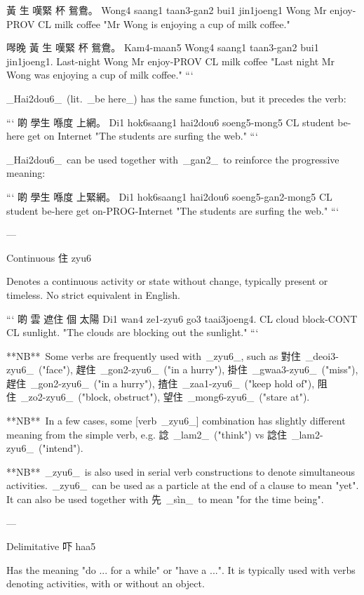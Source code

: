 黃     生      嘆緊         杯    鴛鴦。  
Wong4  saang1  taan3-gan2   bui1  jin1joeng1
Wong   Mr      enjoy-PROV   CL    milk coffee
"Mr Wong is enjoying a cup of milk coffee."  

噖晚        黃      生      嘆緊        杯    鴛鴦。  
Kam4-maan5  Wong4  saang1  taan3-gan2  bui1  jin1joeng1.
Last-night  Wong   Mr      enjoy-PROV  CL    milk coffee
"Last night Mr Wong was enjoying a cup of milk coffee."  
```

_Hai2dou6_ (lit. _be here_) has the same function, but it precedes the verb:

```
啲  學生        喺度       上網。  
Di1 hok6saang1  hai2dou6  soeng5-mong5 
CL  student     be-here   get on Internet
"The students are surfing the web."  
```

_Hai2dou6_ can be used together with _gan2_ to reinforce the progressive meaning:

```
啲  學生        喺度       上緊網。  
Di1 hok6saang1  hai2dou6  soeng5-gan2-mong5  
CL  student     be-here   get on-PROG-Internet
"The students are surfing the web."  
```

---

Continuous 住 zyu6

Denotes a continuous activity or state without change, typically present or timeless. No strict equivalent in English.

```
啲   雲     遮住         個   太陽 
Di1  wan4   ze1-zyu6     go3  taai3joeng4.
CL   cloud  block-CONT   CL  sunlight.  
"The clouds are blocking out the sunlight."  
```

**NB** Some verbs are frequently used with _zyu6_, such as 對住 _deoi3-zyu6_ ("face"), 趕住 _gon2-zyu6_ ("in a hurry"), 掛住 _gwaa3-zyu6_ ("miss"), 趕住 _gon2-zyu6_ ("in a hurry"), 揸住 _zaa1-zyu6_ ("keep hold of"), 阻住 _zo2-zyu6_ ("block, obstruct"), 望住 _mong6-zyu6_ ("stare at").

**NB** In a few cases, some [verb _zyu6_] combination has slightly different meaning from the simple verb, e.g. 諗 _lam2_ ("think") vs 諗住 _lam2-zyu6_ ("intend").

**NB** _zyu6_ is also used in serial verb constructions to denote simultaneous activities. _zyu6_ can be used as a particle at the end of a clause to mean "yet". It can also be used together with 先 _sìn_ to mean "for the time being".

---

Delimitative 吓 haa5

Has the meaning "do ... for a while" or "have a ...". It is typically used with verbs denoting activities, with or without an object.

